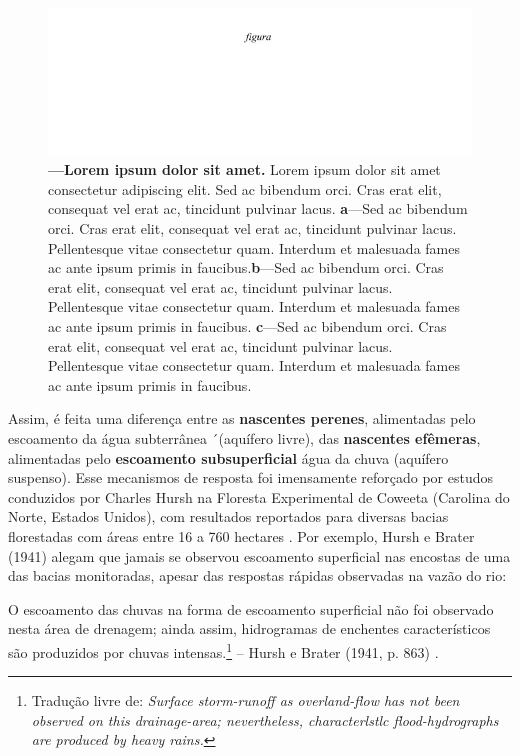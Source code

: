 \documentclass[./main.tex]{subfiles}
\begin{document}
\begin{figure}[t!] 
\centering				
\includegraphics[width=0.95\linewidth]{figs/fig_p.jpg}		
\caption[Lorem ipsum dolor sit amet]
{\textbf{---\;Lorem ipsum dolor sit amet.}
    Lorem ipsum dolor sit amet consectetur adipiscing elit. Sed ac bibendum orci. Cras erat elit, consequat vel erat ac, tincidunt pulvinar lacus. \;\textbf{a}\;---\;Sed ac bibendum orci. Cras erat elit, consequat vel erat ac, tincidunt pulvinar lacus. Pellentesque vitae consectetur quam. Interdum et malesuada fames ac ante ipsum primis in faucibus.\;\textbf{b}\;---\;Sed ac bibendum orci. Cras erat elit, consequat vel erat ac, tincidunt pulvinar lacus. Pellentesque vitae consectetur quam. Interdum et malesuada fames ac ante ipsum primis in faucibus. \;\textbf{c}\;---\;Sed ac bibendum orci. Cras erat elit, consequat vel erat ac, tincidunt pulvinar lacus. Pellentesque vitae consectetur quam. Interdum et malesuada fames ac ante ipsum primis in faucibus.
}
\label{fig:hydro:macro} 		
\end{figure}

\noindent Assim, é feita uma diferença entre as \textbf{nascentes perenes}, alimentadas pelo escoamento da água subterrânea ´(aquífero livre), das \textbf{nascentes efêmeras}, alimentadas pelo \textbf{escoamento subsuperficial} água da chuva (aquífero suspenso). Esse mecanismos de resposta foi imensamente reforçado por estudos conduzidos por Charles Hursh na Floresta Experimental de Coweeta (Carolina do Norte, Estados Unidos), com resultados reportados para diversas bacias florestadas com áreas entre 16 a 760 hectares \cite{Hoover1943, Hursh1944}. Por exemplo, Hursh e Brater (1941) \cite{Hursh1941} alegam que jamais se observou escoamento superficial nas encostas de uma das bacias monitoradas, apesar das respostas rápidas observadas na vazão do rio: 

\begin{adjustwidth}{100pt}{0pt}
\medskip
\small O escoamento das chuvas na forma de escoamento superficial não foi observado nesta área de drenagem; ainda assim, hidrogramas de enchentes característicos são produzidos por chuvas intensas.\footnote{Tradução livre de: \textit{Surface storm-runoff as overland-flow has not been observed on this drainage-area; nevertheless, characterlstlc flood-hydrographs are produced by heavy rains.}} -- Hursh e Brater (1941, p. 863) \cite{Hursh1941}.
\medskip
\end{adjustwidth}
\end{document}
